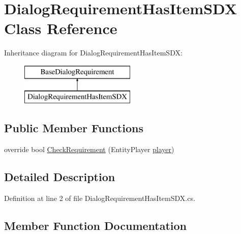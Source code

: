 \hypertarget{class_dialog_requirement_has_item_s_d_x}{}\section{Dialog\+Requirement\+Has\+Item\+S\+DX Class Reference}
\label{class_dialog_requirement_has_item_s_d_x}
Inheritance diagram for Dialog\+Requirement\+Has\+Item\+S\+DX\+:\begin{figure}[H]
\begin{center}
\leavevmode
\includegraphics[height=2.000000cm]{d4/d77/class_dialog_requirement_has_item_s_d_x}
\end{center}
\end{figure}
\subsection*{Public Member Functions}
\begin{DoxyCompactItemize}
\item 
override bool \mbox{\hyperlink{class_dialog_requirement_has_item_s_d_x_aed26e0d37e888fa22817ac23686f9c3e}{Check\+Requirement}} (Entity\+Player \mbox{\hyperlink{_sphere_i_i_01_music_01_boxes_2_config_2_localization_8txt_a4e2cb8aeff651600ea1cc57fe5a929a4}{player}})
\end{DoxyCompactItemize}


\subsection{Detailed Description}


Definition at line 2 of file Dialog\+Requirement\+Has\+Item\+S\+D\+X.\+cs.



\subsection{Member Function Documentation}
\mbox{\label{class_dialog_requirement_has_item_s_d_x_aed26e0d37e888fa22817ac23686f9c3e}} 
